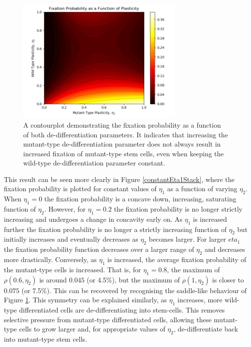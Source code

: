 \documentclass[12pt]{article}
\begin{document}
\begin{figure}[H]
\begin{center}
\includegraphics[width=0.74\textwidth]{contourplot.png}
\end{center}
\caption{A contourplot demonstrating the fixation probability as a function of both de-differentiation parameters. It indicates that increasing the mutant-type de-differentiation parameter does not always result in increased fixation of mutant-type stem cells, even when keeping the wild-type de-differentiation parameter constant.}\label{contour}
\end{figure}

This result can be seen more clearly in Figure \ref{constantEta1Stack}, where the fixation probability is plotted for constant values of $\eta_1$ as a function of varying $\eta_2$. When $\eta_1=0$ the fixation probability is a concave down, increasing, saturating function of $\eta_2$. However, for $\eta_1=0.2$ the fixation probability is no longer strictly increasing and undergoes a change in concavity early on. As $\eta_1$ is increased further the fixation probability is no longer a strictly increasing function of $\eta_2$ but initially increases and eventually decreases as $\eta_2$ becomes larger. For larger $eta_1$ the fixation probability function decreases over a larger range of $\eta_2$ and decreases more drastically. Conversely, as $\eta_1$ is increased, the average fixation probability of the mutant-type cells is increased. That is, for $\eta_1=0.8$, the maximum of $\rho(0.6, \eta_2)$ is around $0.045$ (or 4.5\%), but the maximum of $\rho(1, \eta_2)$ is closer to $0.075$ (or 7.5\%). This can be recovered by recognising the saddle-like behaviour of Figure \ref{contour}. This symmetry can be explained similarly, as $\eta_1$ increases, more wild-type differentiated cells are de-differentiating into stem-cells. This removes selective pressure from mutant-type differentiated cells, allowing these mutant-type cells to grow larger and, for appropriate values of $\eta_2$, de-differentiate back into mutant-type stem cells.
\end{document}

